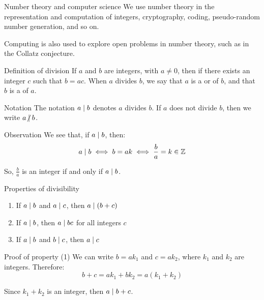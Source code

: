 \documentclass[a4paper]{article}
\begin{document}
\begin{parag}{Number theory and computer science}
    We use number theory in the representation and computation of integers, cryptography, coding, pseudo-random number generation, and so on. 

    Computing is also used to explore open problems in number theory, such as in the Collatz conjecture.
\end{parag}

\begin{parag}{Definition of division}
    If $a$ and $b$ are integers, with $a \neq 0$, then  if there exists an integer $c$ such that $b = ac$. When $a$ divides $b$, we say that $a$ is a  or  of $b$, and that $b$ is a  of $a$.

    \begin{subparag}{Notation}
        The notation $a \mid b$ denotes $a$ divides $b$. If $a$ does not divide $b$, then we write $a \ndivides b$.
    \end{subparag}

    \begin{subparag}{Observation}
        We see that, if $a \mid b$, then: 
        \[a \mid b \iff b = ak \iff \frac{b}{a} = k \in \mathbb{Z}\]
        
        So, $\frac{b}{a}$ is an integer if and only if $a \mid b$.
    \end{subparag}
    
\end{parag}

\begin{parag}{Properties of divisibility}
    \begin{enumerate}[left=0pt]
        \item If $a \mid b$ and $a \mid c$, then $a \divides \left(b + c\right)$
        \item If $a \mid b$, then $a \mid bc$ for all integers $c$
        \item If $a\mid b$ and $b\mid c$, then $a\mid c$
    \end{enumerate}

    \begin{subparag}{Proof of property (1)}
        We can write $b = ak_1$ and $c = ak_2$, where $k_1$ and $k_2$ are integers. Therefore: 
        \[b + c = ak_1 + bk_2 = a\left(k_1 + k_2\right)\]

        Since $k_1 + k_2$ is an integer, then $a \mid b + c$.
        
    \end{subparag}
\end{parag}
\end{document}
